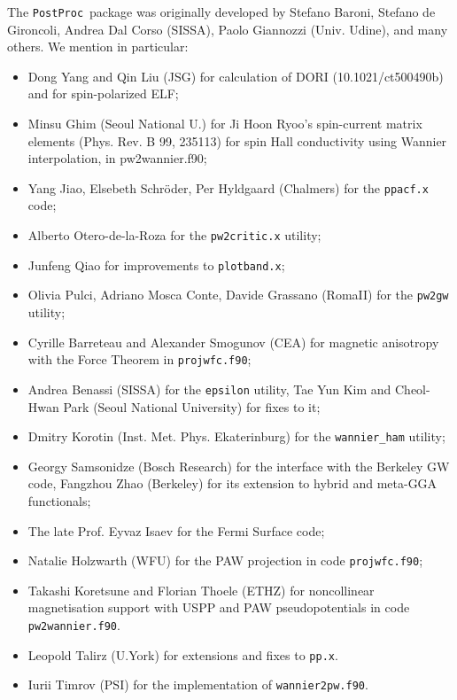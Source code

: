 \documentclass[12pt,a4paper]{article}
\def\PostProc{\texttt{PostProc}}
\begin{document}
The \PostProc\ package was originally developed by Stefano Baroni, 
Stefano de Gironcoli, Andrea Dal Corso (SISSA), Paolo Giannozzi 
(Univ. Udine), and many others. We mention in particular: 
\begin{itemize}
\item Dong Yang and Qin Liu (JSG) for calculation of DORI (10.1021/ct500490b)
      and for spin-polarized ELF;
\item Minsu Ghim (Seoul National U.) for Ji Hoon Ryoo's spin-current matrix
      elements (Phys. Rev. B 99, 235113) for spin Hall conductivity using
      Wannier interpolation, in pw2wannier.f90;
\item Yang Jiao, Elsebeth Schr\"oder, Per Hyldgaard (Chalmers) for the
  \texttt{ppacf.x} code;
\item Alberto Otero-de-la-Roza for the \texttt{pw2critic.x} utility;
\item Junfeng Qiao for improvements to \texttt{plotband.x};
\item Olivia Pulci, Adriano Mosca Conte, Davide Grassano (RomaII)
      for the \texttt{pw2gw} utility;
\item Cyrille Barreteau and Alexander Smogunov (CEA) for 
      magnetic anisotropy with the Force Theorem in \texttt{projwfc.f90};
\item Andrea Benassi (SISSA) for the \texttt{epsilon} utility,
      Tae Yun Kim and Cheol-Hwan Park (Seoul National University)
      for fixes to it;
\item Dmitry Korotin (Inst. Met. Phys. Ekaterinburg) for the
      \texttt{wannier\_ham} utility;
\item Georgy Samsonidze (Bosch Research) for the interface
      with the Berkeley GW code, Fangzhou Zhao (Berkeley) 
      for its extension to hybrid and meta-GGA functionals;
\item The late Prof. Eyvaz Isaev for the Fermi Surface code;
\item Natalie Holzwarth (WFU) for the PAW projection in code
     \texttt{projwfc.f90};
\item Takashi Koretsune and Florian Thoele (ETHZ) for noncollinear 
      magnetisation support with USPP and PAW pseudopotentials in 
      code \texttt{pw2wannier.f90}.
\item Leopold Talirz (U.York) for extensions and fixes to \texttt{pp.x}.
\item Iurii Timrov (PSI) for the implementation of \texttt{wannier2pw.f90}.
\end{itemize}
\end{document}
